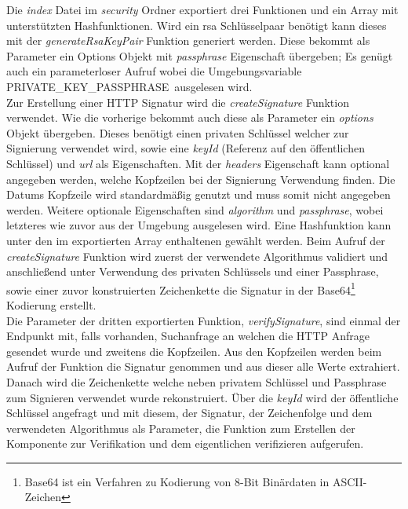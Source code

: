 Die \textit{index} Datei im \textit{security} Ordner exportiert drei Funktionen und ein Array mit unterstützten Hashfunktionen. Wird ein \gls{rsa} Schlüsselpaar benötigt kann dieses mit der \textit{generateRsaKeyPair} Funktion generiert werden. Diese bekommt als Parameter ein Options Objekt mit \textit{passphrase} Eigenschaft übergeben; Es genügt auch ein parameterloser Aufruf wobei die Umgebungsvariable \glqq PRIVATE\_KEY\_PASSPHRASE\grqq~ausgelesen wird.\\

Zur Erstellung einer HTTP Signatur wird die \textit{createSignature} Funktion verwendet. Wie die vorherige bekommt auch diese als Parameter ein \textit{options} Objekt übergeben. Dieses benötigt einen privaten Schlüssel welcher zur Signierung verwendet wird, sowie eine \textit{keyId} (Referenz auf den öffentlichen Schlüssel) und \textit{url} als Eigenschaften. Mit der \textit{headers} Eigenschaft kann optional angegeben werden, welche Kopfzeilen bei der Signierung Verwendung finden. Die Datums Kopfzeile wird standardmäßig genutzt und muss somit nicht angegeben werden. Weitere optionale Eigenschaften sind \textit{algorithm} und \textit{passphrase}, wobei letzteres wie zuvor aus der Umgebung ausgelesen wird. Eine Hashfunktion kann unter den im exportierten Array enthaltenen gewählt werden. Beim Aufruf der \textit{createSignature} Funktion wird zuerst der verwendete Algorithmus validiert und anschließend unter Verwendung des privaten Schlüssels und einer Passphrase, sowie einer zuvor konstruierten Zeichenkette die Signatur in der Base64\footnote{Base64 ist ein Verfahren zu Kodierung von 8-Bit Binärdaten in ASCII-Zeichen} Kodierung erstellt.\\

Die Parameter der dritten exportierten Funktion, \textit{verifySignature}, sind einmal der Endpunkt mit, falls vorhanden, Suchanfrage an welchen die HTTP Anfrage gesendet wurde und zweitens die Kopfzeilen. Aus den Kopfzeilen werden beim Aufruf der Funktion die Signatur genommen und aus dieser alle Werte extrahiert. Danach wird die Zeichenkette welche neben privatem Schlüssel und Passphrase zum Signieren verwendet wurde rekonstruiert. Über die \textit{keyId} wird der öffentliche Schlüssel angefragt und mit diesem, der Signatur, der Zeichenfolge und dem verwendeten Algorithmus als Parameter, die Funktion zum Erstellen der Komponente zur Verifikation und dem eigentlichen verifizieren aufgerufen.\\

